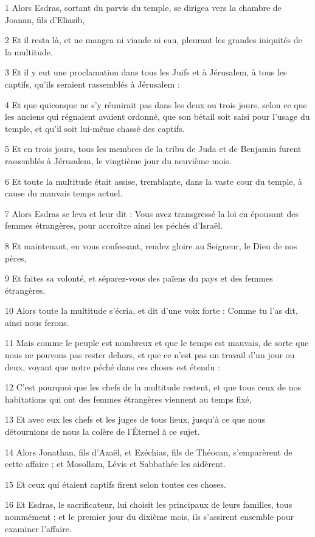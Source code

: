 \par 1 Alors Esdras, sortant du parvis du temple, se dirigea vers la chambre de Joanan, fils d'Eliasib,
\par 2 Et il resta là, et ne mangea ni viande ni eau, pleurant les grandes iniquités de la multitude.
\par 3 Et il y eut une proclamation dans tous les Juifs et à Jérusalem, à tous les captifs, qu'ils seraient rassemblés à Jérusalem :
\par 4 Et que quiconque ne s'y réunirait pas dans les deux ou trois jours, selon ce que les anciens qui régnaient avaient ordonné, que son bétail soit saisi pour l'usage du temple, et qu'il soit lui-même chassé des captifs.
\par 5 Et en trois jours, tous les membres de la tribu de Juda et de Benjamin furent rassemblés à Jérusalem, le vingtième jour du neuvième mois.
\par 6 Et toute la multitude était assise, tremblante, dans la vaste cour du temple, à cause du mauvais temps actuel.
\par 7 Alors Esdras se leva et leur dit : Vous avez transgressé la loi en épousant des femmes étrangères, pour accroître ainsi les péchés d'Israël.
\par 8 Et maintenant, en vous confessant, rendez gloire au Seigneur, le Dieu de nos pères,
\par 9 Et faites sa volonté, et séparez-vous des païens du pays et des femmes étrangères.
\par 10 Alors toute la multitude s'écria, et dit d'une voix forte : Comme tu l'as dit, ainsi nous ferons.
\par 11 Mais comme le peuple est nombreux et que le temps est mauvais, de sorte que nous ne pouvons pas rester dehors, et que ce n'est pas un travail d'un jour ou deux, voyant que notre péché dans ces choses est étendu :
\par 12 C'est pourquoi que les chefs de la multitude restent, et que tous ceux de nos habitations qui ont des femmes étrangères viennent au temps fixé,
\par 13 Et avec eux les chefs et les juges de tous lieux, jusqu'à ce que nous détournions de nous la colère de l'Éternel à ce sujet.
\par 14 Alors Jonathan, fils d'Azaël, et Ezéchias, fils de Théocan, s'emparèrent de cette affaire ; et Mosollam, Lévis et Sabbathée les aidèrent.
\par 15 Et ceux qui étaient captifs firent selon toutes ces choses.
\par 16 Et Esdras, le sacrificateur, lui choisit les principaux de leurs familles, tous nommément ; et le premier jour du dixième mois, ils s'assirent ensemble pour examiner l'affaire.
